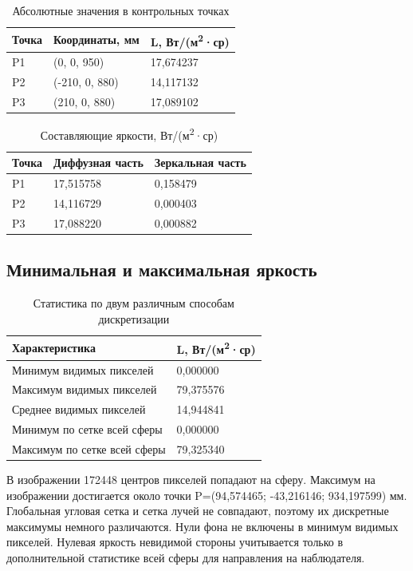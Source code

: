 \documentclass[a4paper,12pt]{article}
\begin{document}
\begin{table}[H]
\centering
\caption{Абсолютные значения в контрольных точках}
\begin{tabular}{@{}p{}p{}p{}@{}}
\toprule
Точка & Координаты, мм & L, Вт/(м\textsuperscript{2}·ср) \\
\midrule
P1 & (0, 0, 950) & 17,674237 \\
P2 & (-210, 0, 880) & 14,117132 \\
P3 & (210, 0, 880) & 17,089102 \\
\bottomrule
\end{tabular}
\end{table}
\begin{table}[H]
\centering
\caption{Составляющие яркости, Вт/(м\textsuperscript{2}·ср)}
\begin{tabular}{@{}p{}p{}p{}@{}}
\toprule
Точка & Диффузная часть & Зеркальная часть \\
\midrule
P1 & 17,515758 & 0,158479 \\
P2 & 14,116729 & 0,000403 \\
P3 & 17,088220 & 0,000882 \\
\bottomrule
\end{tabular}
\end{table}
\subsection{Минимальная и максимальная яркость}
\begin{table}[H]
\centering
\caption{Статистика по двум различным способам дискретизации}
\begin{tabular}{@{}p{}p{}@{}}
\toprule
Характеристика & L, Вт/(м\textsuperscript{2}·ср) \\
\midrule
Минимум видимых пикселей & 0,000000 \\
Максимум видимых пикселей & 79,375576 \\
Среднее видимых пикселей & 14,944841 \\
Минимум по сетке всей сферы & 0,000000 \\
Максимум по сетке всей сферы & 79,325340 \\
\bottomrule
\end{tabular}
\end{table}
В изображении 172448 центров пикселей попадают на сферу. Максимум на изображении достигается около точки P=(94,574465; -43,216146; 934,197599) мм. Глобальная угловая сетка и сетка лучей не совпадают, поэтому их дискретные максимумы немного различаются. Нули фона не включены в минимум видимых пикселей. Нулевая яркость невидимой стороны учитывается только в дополнительной статистике всей сферы для направления на наблюдателя.
\end{document}
